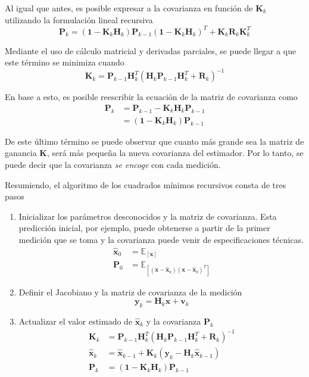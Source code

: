 Al igual que antes, es posible expresar a la covarianza en función de $\textbf{K}_k$ utilizando la formulación lineal recursiva
\begin{equation}
    \textbf{P}_k = (\textbf{1} - \textbf{K}_k\textbf{H}_k)\textbf{P}_{k-1}(\textbf{1}-\textbf{K}_k\textbf{H}_k)^T + \textbf{K}_k\textbf{R}_k\textbf{K}_k^T
\end{equation}

Mediante el uso de cálculo matricial y derivadas parciales, se puede llegar a que este término se minimiza cuando
\begin{equation}
    \textbf{K}_k = \textbf{P}_{k-1}\textbf{H}_k^T(\textbf{H}_k\textbf{P}_{k-1}\textbf{H}_k^T + \textbf{R}_k)^{-1}
\end{equation}

En base a esto, es posible reescribir la ecuación de la matriz de covarianza como
\begin{align}
    \textbf{P}_k &= \textbf{P}_{k-1} - \textbf{K}_k\textbf{H}_k\textbf{P}_{k-1} \\
                 &= (\textbf{1} - \textbf{K}_k\textbf{H}_k)\textbf{P}_{k-1}
\end{align}

De este último término se puede observar que cuanto más grande sea la matriz de ganancia \textbf{K}, será más pequeña la nueva covarianza del estimador. Por lo tanto, se puede decir que la covarianza \textit{se encoge} con cada medición.

Resumiendo, el algoritmo de los cuadrados mínimos recursivos consta de tres pasos
\begin{enumerate}
    \item Inicializar los parámetros desconocidos y la matriz de covarianza. Esta predicción inicial, por ejemplo, puede obtenerse a partir de la primer medición que se toma y la covarianza puede venir de especificaciones técnicas.
        \begin{align}
            \hat{\textbf{x}}_0 &= \mathbb{E}_{[\textbf{x}]} \\
            \textbf{P}_0 &= \mathbb{E}_{[(\textbf{x} - \hat{\textbf{x}}_0)(\textbf{x} - \hat{\textbf{x}}_0)^T]}
        \end{align}
    \item Definir el Jacobiano y la matriz de covarianza de la medición
        \begin{equation}
          \textbf{y}_k = \textbf{H}_k\textbf{x}+\textbf{v}_k
        \end{equation}
    \item Actualizar el valor estimado de $\hat{\textbf{x}}_k$ y la covarianza $\textbf{P}_k$
        \begin{align}
            \textbf{K}_k &= \textbf{P}_{k-1}\textbf{H}_k^T(\textbf{H}_k\textbf{P}_{k-1}\textbf{H}_k^T + \textbf{R}_k)^{-1} \\
            \hat{\textbf{x}}_k &= \hat{\textbf{x}}_{k-1} + \textbf{K}_k(\textbf{y}_k - \textbf{H}_k\hat{\textbf{x}}_{k-1}) \\
            \textbf{P}_k &= (\textbf{1} - \textbf{K}_k\textbf{H}_k)\textbf{P}_{k-1}
        \end{align}
\end{enumerate}

